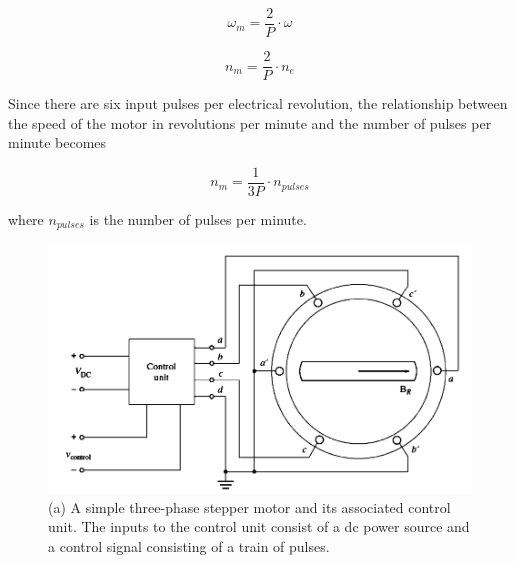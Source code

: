\documentclass[journal]{IEEEtran}
\begin{document}
\begin{equation}
    \omega_m = \frac{2}{P} \cdot \omega %
\end{equation}

\begin{equation}
    n_m = \frac{2}{P} \cdot n_e  %
\end{equation}



Since there are six input pulses per electrical revolution, the relationship between the speed of the motor in revolutions per minute and the number of pulses per minute becomes

\begin{equation}
    n_m = \frac{1}{3P} \cdot n_{pulses}
\end{equation}

where $n_{pulses}$ is the number of pulses per minute.


\begin{figure}[h]
    \centering
    \includegraphics[scale=0.32]{Stepper/fig 10-38-a.PNG}
    \caption{(a) A simple three-phase stepper motor and its associated control unit. The inputs to the control unit consist of a dc power source and a control signal consisting of a train of pulses.}
    \label{fig:Stepper 10-38-a}
\end{figure}
\end{document}
